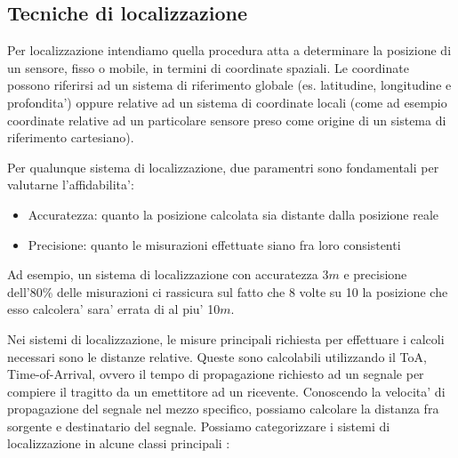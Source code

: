 \subsection{Tecniche di localizzazione}
Per localizzazione intendiamo quella procedura atta a determinare la posizione di un sensore, fisso o mobile, in termini di coordinate spaziali. Le coordinate possono riferirsi ad un sistema di riferimento globale (es. latitudine, longitudine e profondita') oppure relative ad un sistema di coordinate locali (come ad esempio coordinate relative ad un particolare sensore preso come origine di un sistema di riferimento cartesiano).
\par
Per qualunque sistema di localizzazione, due paramentri sono fondamentali per valutarne l'affidabilita':
\begin{itemize}
    \item Accuratezza: quanto la posizione calcolata sia distante dalla posizione reale
    \item Precisione: quanto le misurazioni effettuate siano fra loro consistenti
\end{itemize}
Ad esempio, un sistema di localizzazione con accuratezza 3$m$  e precisione dell'80\% delle misurazioni ci rassicura sul fatto che 8 volte su 10 la posizione che esso calcolera' sara' errata di al piu' 10$m$.
\par
Nei sistemi di localizzazione, le misure principali richiesta per effettuare i calcoli necessari sono le distanze relative. Queste sono calcolabili utilizzando il ToA, Time-of-Arrival, ovvero il tempo di propagazione richiesto ad un segnale per compiere il tragitto da un emettitore ad un ricevente. Conoscendo la velocita' di propagazione del segnale nel mezzo specifico, possiamo calcolare la distanza fra sorgente e destinatario del segnale.
Possiamo categorizzare i sistemi di localizzazione in alcune classi principali \cite{trilateration}:
